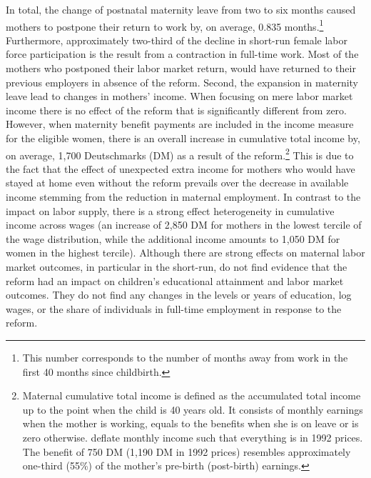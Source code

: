 \documentclass[11pt, a4paper,draft]{article} %
\begin{document}
In total, the change of postnatal maternity leave from two to six months caused mothers to postpone their return to work by, on average, 0.835 months.\footnote{This number corresponds to the number of months away from work in the first 40 months since childbirth.} Furthermore, approximately two-third of the decline in short-run female labor force participation is the result from a contraction in full-time work. Most of the mothers who postponed their labor market return, would have returned to their previous employers in absence of the reform. \newline
Second, the expansion in maternity leave lead to changes in mothers' income. When focusing on mere labor market income there is no effect of the reform that is significantly different from zero. However, when maternity benefit payments are included in the income measure for the eligible women, there is an overall increase in cumulative total income by, on average, 1,700 Deutschmarks (DM) as a result of the reform.\footnote{Maternal cumulative total  income is defined as the accumulated total income up to the point when the child is 40 years old. It consists of monthly earnings when the mother is working, equals to the benefits when she is on leave or is zero otherwise.\newline \cite{Dustmann2012} deflate monthly income such that everything is in 1992 prices. The benefit of 750 DM (1,190 DM in 1992 prices) resembles approximately one-third (55\%) of the mother's pre-birth (post-birth) earnings.} This is due to the fact that the effect of unexpected extra income for mothers who would have stayed at home even without the reform prevails over the decrease in available income stemming from the reduction in maternal employment. In contrast to the impact on labor supply, there is a strong effect heterogeneity in cumulative income across wages (an increase of 2,850 DM for mothers in the lowest tercile of the wage distribution, while the additional income amounts to 1,050 DM for women in the highest tercile). \newline
Although there are strong effects on maternal labor market outcomes, in particular in the short-run, \cite{Dustmann2012} do not find evidence that the reform had an impact on children's educational attainment and labor market outcomes. They do not find any changes in the levels or years of education, log wages, or the share of individuals in full-time employment in response to the reform. 
\end{document}
